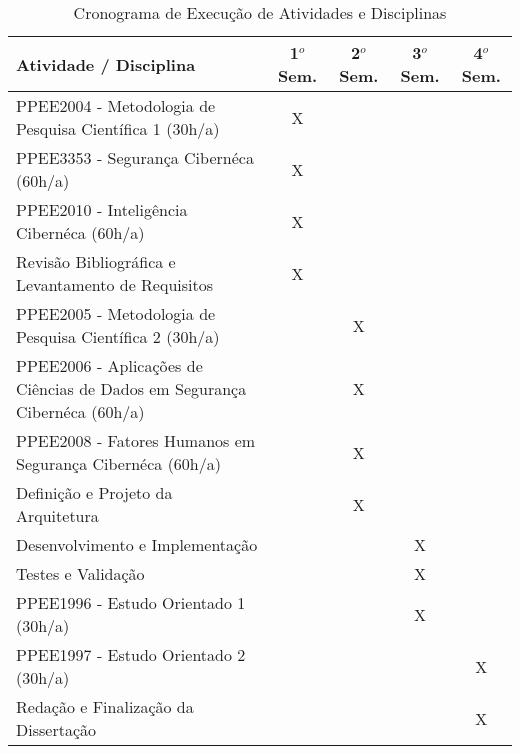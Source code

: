 \documentclass[article,12pt,a4paper]{abntex2}
\begin{document}
\begin{table}[H]
	\centering
	\label{tab:cronograma}
	\begin{tabular}{|p{6cm}|c|c|c|c|}
		\hline
		\textbf{Atividade / Disciplina} & \textbf{1$^o$ Sem.} & \textbf{2$^o$ Sem.} & \textbf{3$^o$ Sem.} & \textbf{4$^o$ Sem.} \\
		\hline
		PPEE2004 - Metodologia de Pesquisa Científica 1 (30h/a) & \cellcolor{gray!20} X &  &  &  \\
		\hline
		PPEE3353 - Segurança Cibernéca (60h/a) & \cellcolor{gray!20} X &  &  &  \\
		\hline
		PPEE2010 - Inteligência Cibernéca (60h/a) & \cellcolor{gray!20} X &  &  &  \\
		\hline
    Revisão Bibliográfica e Levantamento de Requisitos & \cellcolor{gray!20} X &  &  &  \\
		\hline
		PPEE2005 - Metodologia de Pesquisa Científica 2 (30h/a) &  & \cellcolor{gray!20} X &  &  \\
		\hline
		PPEE2006 - Aplicações de Ciências de Dados em Segurança Cibernéca (60h/a) &  & \cellcolor{gray!20} X &  &  \\
		\hline
		PPEE2008 - Fatores Humanos em Segurança Cibernéca (60h/a) &  & \cellcolor{gray!20} X &  &  \\
		\hline
		Definição e Projeto da Arquitetura &  & \cellcolor{gray!20} X &  &  \\
		\hline
		Desenvolvimento e Implementação &  &  & \cellcolor{gray!20} X &  \\
		\hline
		Testes e Validação &  &  & \cellcolor{gray!20} X &  \\
		\hline
    PPEE1996 - Estudo Orientado 1 (30h/a) &  &  & \cellcolor{gray!20} X &  \\
		\hline
		PPEE1997 - Estudo Orientado 2 (30h/a) &  &  &  & \cellcolor{gray!20} X \\
		\hline
    Redação e Finalização da Dissertação &  &  &  & \cellcolor{gray!20} X \\
		\hline
	\end{tabular}
	\caption{Cronograma de Execução de Atividades e Disciplinas}
\end{table}


\newpage


\end{document}
